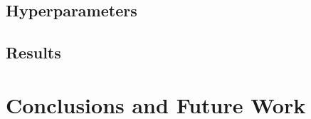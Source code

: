 \documentclass{article}
\begin{document}
\subsection{Hyperparameters}

\subsection{Results}

\section{Conclusions and Future Work}






\end{document}
